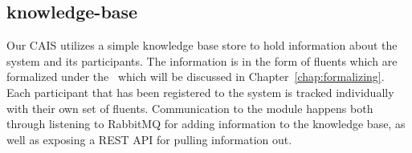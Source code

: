 \subsection{knowledge-base}

Our CAIS utilizes a simple knowledge base store to hold information about the system and its participants.
The information is in the form of fluents which are formalized under the \CEC\, which will be discussed
in Chapter~\ref{chap:formalizing}. Each participant that has been registered to the system is tracked
individually with their own set of fluents. Communication to the module happens both through listening to RabbitMQ for adding information to the knowledge base, as well as exposing a REST API for pulling information
out.